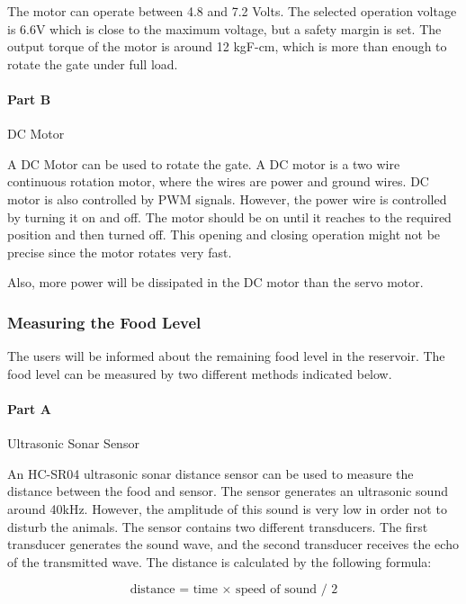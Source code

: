   The motor can operate between 4.8 and 7.2 Volts. The selected operation voltage is 6.6V which is close to the maximum voltage, but a safety margin is set. The output torque of the motor is around 12 kgF-cm, which is more than enough to rotate the gate under full load. \cite{cite:servomotor}
  
 
 \paragraph{Part B} DC Motor
 
 A DC Motor can be used to rotate the gate. A DC motor is a two wire continuous rotation motor, where the wires are power and ground wires. DC motor is also controlled by PWM signals. However, the power wire is controlled by turning it on and off. The motor should be on until it reaches to the required position and then turned off. This opening and closing operation might not be precise since the motor rotates very fast.
 
Also, more power will be dissipated in the DC motor than the servo motor. 
 
 
 
 
 
   \subsubsection{Measuring the Food Level}
   
   The users will be informed about the remaining food level in the reservoir. The food level can be measured by two different methods indicated below.
 
 \paragraph{Part A} Ultrasonic Sonar Sensor 
 
 An HC-SR04 ultrasonic sonar distance sensor can be used to measure the distance between the food and sensor. The sensor generates an ultrasonic sound around 40kHz. However, the amplitude of this sound is very low in order not to disturb the animals. The sensor contains two different transducers. The first transducer generates the sound wave, and the second transducer receives the echo of the transmitted wave. The distance is calculated by the following formula:
 
\begin{equation}
\text{distance = time $\times$ speed of sound  /  2}
\end{equation} %


